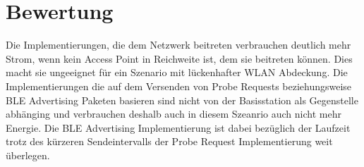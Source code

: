 
\section{Bewertung}
Die Implementierungen, die dem Netzwerk beitreten verbrauchen deutlich mehr Strom, wenn kein Access Point in Reichweite ist, dem sie beitreten können.
Dies macht sie ungeeignet für ein Szenario mit lückenhafter WLAN Abdeckung.
Die Implementierungen die auf dem Versenden von Probe Requests beziehungsweise BLE Advertising Paketen basieren sind nicht von der Basisstation als Gegenstelle abhänging und verbrauchen deshalb auch in diesem Szeanrio auch nicht mehr Energie.
Die BLE Advertising Implementierung ist dabei bezüglich der Laufzeit trotz des kürzeren Sendeintervalls der Probe Request Implementierung weit überlegen.
